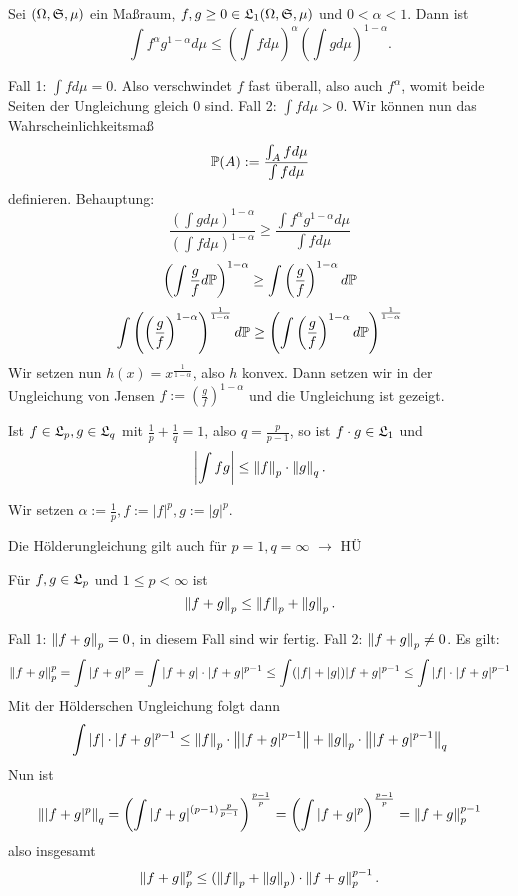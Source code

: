 	\begin{lemma}
		Sei $(\Omega, \S, \mu)$ ein Maßraum, $f,g\ge0 \in\L_1(\Omega, \S, \mu)$ und $0<\alpha<1$. Dann ist
		\[ \int f^\alpha g^{1-\alpha}d\mu \le \left(\int fd\mu\right)^\alpha\left(\int gd\mu\right)^{1-\alpha}. \]
	\end{lemma}

	\begin{bew}
		Fall 1: $\int fd\mu=0$. Also verschwindet $f$ fast überall, also auch $f^\alpha$, womit beide Seiten der Ungleichung gleich 0 sind. \newline
		Fall 2: $\int fd\mu>0$. Wir können nun das Wahrscheinlichkeitsmaß
		\[ \P(A):=\frac{\int_A fd\mu}{\int fd\mu} \]
		definieren. Behauptung:
		\[ \frac{\left(\int gd\mu\right)^{1-\alpha}}{\left(\int fd\mu\right)^{1-\alpha}}\ge \frac{\int f^\alpha g^{1-\alpha}d \mu}{\int fd\mu} \]
		\[ \left(\int \frac{g}{f}d\P\right)^{1-\alpha}\ge \int \left(\frac{g}{f}\right)^{1-\alpha}d\P \]
		\[ \int\left(\left(\frac{g}{f}\right)^{1-\alpha}\right)^\frac{1}{1-\alpha}d\P\ge\left(\int\left(\frac{g}{f}\right)^{1-\alpha} d\P\right)^\frac{1}{1-\alpha} \]
		Wir setzen nun $h(x)=x^\frac{1}{1-\alpha}$, also $h$ konvex. Dann setzen wir in der Ungleichung von Jensen $f:=\left(\frac{g}{f}\right)^{1-\alpha}$ und die Ungleichung ist gezeigt. 
	\end{bew}

	\begin{satz}
		Ist $f\in\L_p, g\in\L_q$ mit $\frac{1}{p}+\frac{1}{q}=1$, also $q=\frac{p}{p-1}$, so ist $f\cdot g\in\L_1$ und 
		\[ \left|\int fg\right|\le \norm{f}_p\cdot\norm{g}_q. \]
	\end{satz}

	\begin{bew}
		Wir setzen $\alpha:=\frac{1}{p}, f:=|f|^p, g:=|g|^p$. 
	\end{bew}

	\begin{bem}
		Die Hölderungleichung gilt auch für $p=1, q=\infty$ $\rightarrow$ HÜ
	\end{bem}
	
	\begin{satz} 
		Für $f,g\in\L_p$ und $1\le p<\infty$ ist
		\[ \norm{f+g}_p\le \norm{f}_p+\norm{g}_p. \]
	\end{satz}

	\begin{bew}
		Fall 1: $\norm{f+g}_p=0$, in diesem Fall sind wir fertig.
		Fall 2: $\norm{f+g}_p\neq 0$. Es gilt:
		\[ \norm{f+g}_p^p=\int |f+g|^p=\int|f+g|\cdot|f+g|^{p-1}\le \int (|f|+|g|)|f+g|^{p-1}\le\int|f|\cdot|f+g|^{p-1} \]
		Mit der Hölderschen Ungleichung folgt dann
		\[ \int|f|\cdot|f+g|^{p-1} \le \norm{f}_p\cdot\norm{|f+g|^{p-1}}+\norm{g}_p\cdot\norm{|f+g|^{p-1}}_q \]
		Nun ist
		\[ \norm{|f+g|^p}_q = \left(\int|f+g|^{(p-1)\frac{p}{p-1}}\right)^\frac{p-1}{p} = \left(\int|f+g|^p\right)^\frac{p-1}{p} = \norm{f+g}_p^{p-1} \]
		also insgesamt
		\[ \norm{f+g}_p^p\le (\norm{f}_p+\norm{g}_p)\cdot \norm{f+g}_p^{p-1}. \]
	\end{bew}

